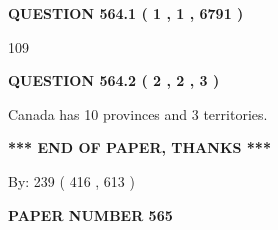 \documentclass[12pt]{article}
\begin{document}
   
   
   
 \vspace{0.2in}
 
 
 
 
   
   
  
\vspace{0.2in}
  
{\textbf{\Large{QUESTION
564.1 
 ( 1 , 1 , 6791 )
}}}
  
  
 
 
\noindent{}

109
 
 
  
\vspace{0.2in}
  
{\textbf{\Large{QUESTION
564.2 
 ( 2 , 2 , 3 )
}}}
  
  
 
 
\noindent{}
 
 
Canada has 10  provinces and 3 territories.
 
 
 
 
   
   
 \vspace{0.2in}
 
   
   
   
   
\vspace{1.0in} 
{\textbf{\large{ *** END OF PAPER, THANKS *** }}} 
   
   
\hspace{1.0in} By: 
 239 ( 416 ,  613 )
   
   
   
   
\newpage 
\setcounter{page}{ 
   565001 } 
   
   
   
   
 {\textbf{ \Large{ PAPER NUMBER  565  }}}
   
   
\vspace{0.2in}
   
   
   
   
   
   
 \vspace{0.2in}
 
 
 
 
   
\end{document}
